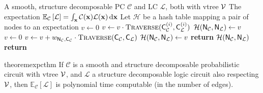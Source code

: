 \begin{algorithm}[t]
  \caption{\expc}\label{alg:expc}
  \begin{algorithmic}[1]
    \Require A smooth, structure decomposable PC $\mathcal{C}$ and LC $\mathcal{L}$, both with vtree
      $\operatorname{\mathcal{V}}$
      \Ensure The expectation $\mathbb{E}_\mathcal{C}\left[\mathcal{L}\right]=\int_{\mathbf{x}}\mathcal{C}(\mathbf{x})
      \mathcal{L}(\mathbf{x})\mathop{}\!\mathrm{d}\mathbf{x}$
    \State Let $\mathcal{H}$ be a hash table mapping a pair of nodes to an expectation
        \State $v\gets 0$
          \State $v\gets v\cdot\Call{Traverse}{\Child_\mathcal{C}^{(i)},\Child_\mathcal{L}^{(i)}}$
        \EndFor%
        \State $\mathcal{H}(\operatorname{\textup{\textsf{N}}}_\mathcal{C},\operatorname{\textup{\textsf{N}}}_\mathcal{L})\gets v$
      \EndNIElseIf%
        \State $v\gets 0$
            \State $v\gets v + w_{\Node_\mathcal{C},\Child_\mathcal{C}}\cdot\Call{Traverse}{\Child_\mathcal{C},\Child_\mathcal{L}}$
          \EndFor%
        \EndFor%
        \State $\mathcal{H}(\operatorname{\textup{\textsf{N}}}_\mathcal{C},\operatorname{\textup{\textsf{N}}}_\mathcal{L})\gets v$
      \EndNIElseIf
      \State \textbf{return} $\mathcal{H}(\operatorname{\textup{\textsf{N}}}_\mathcal{C},\operatorname{\textup{\textsf{N}}}_\mathcal{L})$
    \EndFunction%
    \State \textbf{return} 
  \end{algorithmic}
\end{algorithm}

\begin{restatable}{theorem}{expcthm}\label{thm:expc}
  If $\mathcal{C}$ is a smooth and structure decomposable probabilistic circuit with vtree
  $\operatorname{\mathcal{V}}$, and $\mathcal{L}$ a structure decomposable logic circuit also respecting $\operatorname{\mathcal{V}}$, then
  $\mathbb{E}_\mathcal{C}\left[\mathcal{L}\right]$ is polynomial time computable (in the number of
  edges).
\end{restatable}

